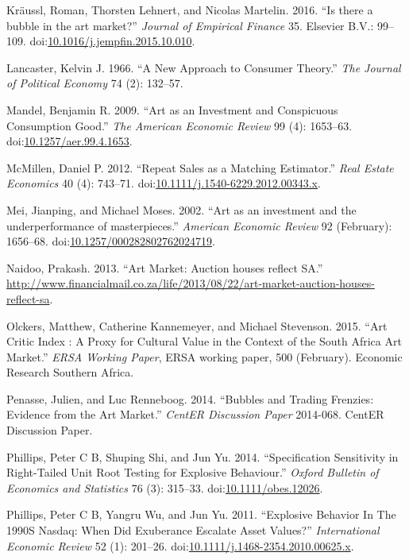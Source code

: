 \documentclass[]{elsarticle} %
\begin{document}
\hypertarget{ref-Kraussl2016}{}
Kräussl, Roman, Thorsten Lehnert, and Nicolas Martelin. 2016. ``Is there
a bubble in the art market?'' \emph{Journal of Empirical Finance} 35.
Elsevier B.V.: 99--109.
doi:\href{https://doi.org/10.1016/j.jempfin.2015.10.010}{10.1016/j.jempfin.2015.10.010}.

\hypertarget{ref-Lancaster1966}{}
Lancaster, Kelvin J. 1966. ``A New Approach to Consumer Theory.''
\emph{The Journal of Political Economy} 74 (2): 132--57.

\hypertarget{ref-Mandel2009}{}
Mandel, Benjamin R. 2009. ``Art as an Investment and Conspicuous
Consumption Good.'' \emph{The American Economic Review} 99 (4):
1653--63.
doi:\href{https://doi.org/10.1257/aer.99.4.1653}{10.1257/aer.99.4.1653}.

\hypertarget{ref-McMillen2012}{}
McMillen, Daniel P. 2012. ``Repeat Sales as a Matching Estimator.''
\emph{Real Estate Economics} 40 (4): 743--71.
doi:\href{https://doi.org/10.1111/j.1540-6229.2012.00343.x}{10.1111/j.1540-6229.2012.00343.x}.

\hypertarget{ref-Mei2002}{}
Mei, Jianping, and Michael Moses. 2002. ``Art as an investment and the
underperformance of masterpieces.'' \emph{American Economic Review} 92
(February): 1656--68.
doi:\href{https://doi.org/10.1257/000282802762024719}{10.1257/000282802762024719}.

\hypertarget{ref-Naidoo2013}{}
Naidoo, Prakash. 2013. ``Art Market: Auction houses reflect SA.''
\url{http://www.financialmail.co.za/life/2013/08/22/art-market-auction-houses-reflect-sa}.

\hypertarget{ref-Olckers2015}{}
Olckers, Matthew, Catherine Kannemeyer, and Michael Stevenson. 2015.
``Art Critic Index : A Proxy for Cultural Value in the Context of the
South Africa Art Market.'' \emph{ERSA Working Paper}, ERSA working
paper, 500 (February). Economic Research Southern Africa.

\hypertarget{ref-Penasse2014}{}
Penasse, Julien, and Luc Renneboog. 2014. ``Bubbles and Trading
Frenzies: Evidence from the Art Market.'' \emph{CentER Discussion Paper}
2014-068. CentER Discussion Paper.

\hypertarget{ref-Phillips2014}{}
Phillips, Peter C B, Shuping Shi, and Jun Yu. 2014. ``Specification
Sensitivity in Right-Tailed Unit Root Testing for Explosive Behaviour.''
\emph{Oxford Bulletin of Economics and Statistics} 76 (3): 315--33.
doi:\href{https://doi.org/10.1111/obes.12026}{10.1111/obes.12026}.

\hypertarget{ref-Phillips2011}{}
Phillips, Peter C B, Yangru Wu, and Jun Yu. 2011. ``Explosive Behavior
In The 1990S Nasdaq: When Did Exuberance Escalate Asset Values?''
\emph{International Economic Review} 52 (1): 201--26.
doi:\href{https://doi.org/10.1111/j.1468-2354.2010.00625.x}{10.1111/j.1468-2354.2010.00625.x}.
\end{document}

